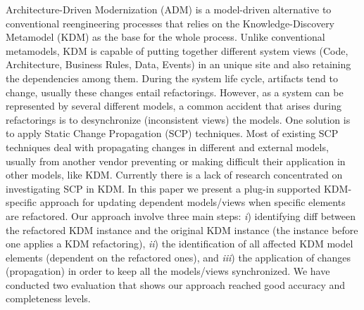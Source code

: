 %
Architecture-Driven Modernization (ADM) is a model-driven alternative to conventional reengineering processes that relies on the Knowledge-Discovery Metamodel (KDM) as the base for the whole process. Unlike conventional metamodels, KDM is capable of putting together different system views (Code, Architecture, Business Rules, Data, Events) in an unique site and also retaining the dependencies among them. During the system life cycle, artifacts tend to change, usually these changes entail refactorings. However, as a system can be represented by several different models, a common accident that arises during refactorings is to desynchronize (inconsistent views) the models. One solution is to apply Static Change Propagation (SCP) techniques. Most of existing SCP techniques deal with propagating changes in different and external models, usually from another vendor preventing or making difficult their application in other models, like KDM. Currently there is a lack of research concentrated on investigating SCP in KDM. In this paper we present a plug-in supported KDM-specific approach for updating dependent models/views when specific elements are refactored. Our approach involve three main steps: \textit{i}) identifying diff between the refactored KDM instance and the original KDM instance (the instance before one applies a KDM refactoring), \textit{ii}) the identification of all affected KDM model elements (dependent on the refactored ones), and \textit{iii}) the application of changes (propagation) in order to keep all the models/views synchronized. We have conducted two evaluation that shows our approach reached good accuracy and completeness levels.